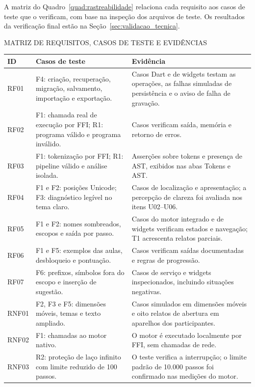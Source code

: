 \documentclass[
    12pt
    ,oneside
    ,a4paper
    ,chapter=TITLE
    ,section=TITLE
    ,sumario=abnt-6027-2012]{abntex2}
\renewcommand{\legenda}[2][]{%
    \centering
    \caption[\MakeTextUppercase{#2}]{\maybeLabel{#1}\MakeTextUppercase{#2}}%
}
\begin{document}
A matriz do Quadro~\ref{quad:rastreabilidade} relaciona cada requisito aos casos
de teste que o verificam, com base na inspeção dos arquivos de teste. Os resultados
da verificação final estão na Seção~\ref{sec:validacao_tecnica}.

\begin{quadro}[htb]
\centering
\legenda[quad:rastreabilidade]{Matriz de requisitos, casos de teste e evidências}
\footnotesize
\begin{tabular}{|P{1.4cm}|P{5.2cm}|P{6.2cm}|}
\hline
ID & Casos de teste & Evidência \\
\hline\hline
RF01 & F4: criação, recuperação, migração, salvamento, importação e exportação. & Casos Dart e de widgets testam as operações, as falhas simuladas de persistência e o aviso de falha de gravação. \\
\hline
RF02 & F1: chamada real de execução por FFI; R1: programa válido e programa inválido. & Casos verificam saída, memória e retorno de erros. \\
\hline
RF03 & F1: tokenização por FFI; R1: pipeline válido e análise isolada. & Asserções sobre tokens e presença de AST, exibidos nas abas Tokens e AST. \\
\hline
RF04 & F1 e F2: posições Unicode; F3: diagnóstico legível no tema claro. & Casos de localização e apresentação; a percepção de clareza foi avaliada nos itens U02--U06. \\
\hline
RF05 & F1 e F2: nomes sombreados, escopos e saída por passo. & Casos do motor integrado e de widgets verificam estados e navegação; T1 acrescenta relatos parciais. \\
\hline
RF06 & F1 e F5: exemplos das aulas, desbloqueio e pontuação. & Casos verificam saídas documentadas e regras de progressão. \\
\hline
RF07 & F6: prefixos, símbolos fora do escopo e inserção de sugestão. & Casos de serviço e widgets inspecionados, incluindo situações negativas. \\
\hline
RNF01 & F2, F3 e F5: dimensões móveis, temas e texto ampliado. & Casos simulados em dimensões móveis e oito relatos de abertura em aparelhos dos participantes. \\
\hline
RNF02 & F1: chamadas ao motor nativo. & O motor é executado localmente por FFI, sem chamadas de rede. \\
\hline
RNF03 & R2: proteção de laço infinito com limite reduzido de 100 passos. & O teste verifica a interrupção; o limite padrão de 10.000 passos foi confirmado nas medições do motor. \\
\hline
\end{tabular}
\vspace{0.2cm}
\end{quadro}
\FloatBarrier
\end{document}
